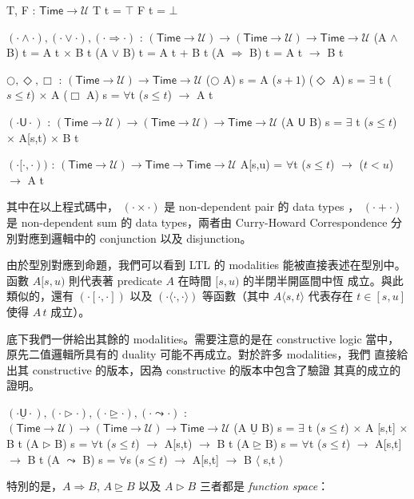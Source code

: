 \documentclass{article}
\newcommand{\Time}{\mathsf{Time}}
\newcommand{\TU}{\mathsf{U}}
\newcommand{\U}{\mathcal{U}}
\begin{document}
  \begin{code}
  T, F : $\Time\to\U$
  T t = $\top$
  F t = $\bot$

  $(\cdot\land\cdot), (\cdot\lor\cdot), (\cdot\Rightarrow\cdot)$ : $(\Time\to\U)\to(\Time\to\U)\to\Time\to\U$
  (A $\land$ B) t = A t $\times$ B t
  (A $\lor$ B) t = A t + B t
  (A $\Rightarrow$ B) t = A t $\to$ B t

  $\bigcirc,\Diamond,\Box$ : $(\Time\to\U)\to\Time\to\U$
  ($\bigcirc$ A) s = A ($s+1$)
  ($\Diamond$ A) s = $\exists$ {t} ($s\le t$) $\times$ A 
  ($\Box$ A) s = $\forall${t} ($s\le t$) $\to$ A t

  $(\cdot\TU\cdot)$ : $(\Time\to\U)\to(\Time\to\U)\to\Time\to\U$
  (A $\TU$ B) s = $\exists$ {t} ($s\le t$) $\times$ A[s,t) $\times$ B t

  $(\cdot[\cdot,\cdot))$ : $(\Time\to\U)\to\Time\to\Time\to\U$
  A[s,u) = $\forall${t} ($s\le t$) $\to$ ($t<u$) $\to$ A t
  \end{code}

  其中在以上程式碼中， $(\cdot\times\cdot)$ 是 non-dependent pair 的 data types
  ， $(\cdot+\cdot)$ 是 non-dependent sum 的 data types，兩者由 Curry-Howard
  Correspondence 分別對應到邏輯中的 conjunction 以及 disjunction。

  由於型別對應到命題，我們可以看到 LTL 的 modalities 能被直接表述在型別中。
  函數 $A [s,u)$ 則代表著 predicate $A$ 在時間 $[s,u)$ 的半閉半開區間中恆
  成立。與此類似的，還有 $(\cdot[\cdot,\cdot])$ 以及
  $(\cdot\langle\cdot,\cdot\rangle)$ 等函數（其中 $A\langle s,t\rangle$
  代表存在 $t\in [s,u]$ 使得 $A\,t$ 成立）。

  底下我們一併給出其餘的 modalities。需要注意的是在 constructive logic
  當中，原先二值邏輯所具有的 duality 可能不再成立。對於許多 modalities，我們
  直接給出其 constructive 的版本，因為 constructive 的版本中包含了驗證
  其真的成立的證明。

  \begin{code}
  $(\cdot\underline{\TU}\cdot),(\cdot\rhd\cdot),(\cdot\unrhd\cdot),(\cdot\leadsto\cdot)$ : $(\Time\to\U)\to(\Time\to\U)\to\Time\to\U$
  (A $\underline{\TU}$ B) s = $\exists$ {t} ($s\le t$) $\times$ A [s,t] $\times$ B t
  (A $\rhd$ B) s = $\forall${t} ($s\le t$) $\to$ A[s,t) $\to$ B t
  (A $\unrhd$ B) s = $\forall${t} ($s\le t$) $\to$ A[s,t] $\to$ B t
  (A $\leadsto$ B) s = $\forall${s} ($s\le t$) $\to$ A[s,t] $\to$ B $\langle$ s,t $\rangle$
  \end{code}

  特別的是，$A\Rightarrow B$, $A\unrhd B$ 以及 $A\rhd B$ 三者都是
  \emph{function space}：
\end{document}
